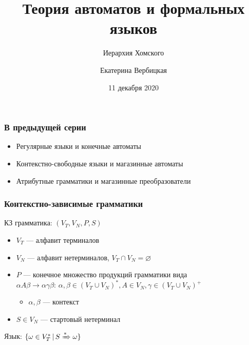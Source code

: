\documentclass{beamer}
\title[]{Теория автоматов и формальных языков}
\subtitle[]{Иерархия Хомского}
\institute[]{
Санкт-Петербургский государственный электротехнический университет <<ЛЭТИ>>\\
}
\author[]{Екатерина Вербицкая}
\date{11 декабря 2020}
\newcommand{\derive}[0]{\xRightarrow[]{*}}
\begin{document}
{
  \begin{frame}
    \titlepage
  \end{frame}
}

\begin{frame}[fragile]
  \transwipe[direction=90]
  \frametitle{В предыдущей серии}
  \begin{itemize}
    \item Регулярные языки и конечные автоматы
    \item Контекстно-свободные языки и магазинные автоматы
    \item Атрибутные грамматики и магазинные преобразователи
  \end{itemize}
\end{frame}

\begin{frame}[fragile]
  \transwipe[direction=90]
  \frametitle{Контекстно-зависимые грамматики}

  \begin{center}
    КЗ грамматика: $(V_T, V_N, P, S)$
  \end{center}

  \begin{itemize}
    \item $V_T$ --- алфавит терминалов
    \item $V_N$ --- алфавит нетерминалов, $V_T \cap V_N = \varnothing$
    \item $P$ --- конечное множество продукций грамматики вида $\alpha A \beta \rightarrow \alpha \gamma \beta: \, \alpha, \beta \in (V_T \cup V_N)^*, A \in V_N, \gamma \in (V_T \cup V_N)^+$
    \begin{itemize}
      \item $\alpha, \beta$ --- контекст
    \end{itemize}
    \item $S \in V_N$ --- стартовый нетерминал
  \end{itemize}


  \begin{center}
    Язык: $\{ \omega \in V_T^* \, | \, S \derive \omega\}$
  \end{center}
\end{frame}
\end{document}
